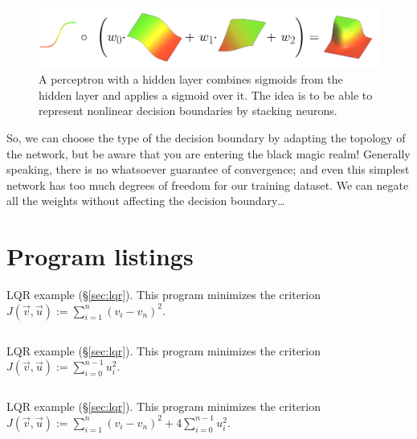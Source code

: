 \documentclass[notitlepage,oneside]{book}
\makeatletter
\newcommand{\authoredby}[1]{\addtocontents{toc}{\protect\@nameuse{authoredby#1}}}%
\makeatother
\begin{document}
\begin{figure}[t]
    \centering
    \includegraphics[width=.9\linewidth]{img/3n.jpg}
    \caption{A perceptron with a hidden layer combines sigmoids from the hidden layer and applies a sigmoid over it.
    The idea is to be able to represent nonlinear decision boundaries by stacking neurons.}
    \label{fig:sigmoids}
\end{figure}

So, we can choose the type of the decision boundary by adapting the topology of the network, but be aware that you are entering the black magic realm!
Generally speaking, there is no whatsoever guarantee of convergence; and even this simplest network has too much degrees of freedom for our training dataset.
We can negate all the weights without affecting the decision boundary\dots


\appendix
\authoredby{B}
\chapter{Program listings}
\fancyhead[R]{\textcolor{ao(english)}{core text}}

\begin{listing}[p]
\caption{LQR example (\S\ref{sec:lqr}). This program minimizes the criterion $J(\vec{v}, \vec{u}) := \sum\limits_{i=1}^n (v_i-v_n)^2$.}
\inputminted[frame=single,linenos=true]{python}{listings/example_6.1_a.py}
\label{listing:lqr1}
\end{listing}

\begin{listing}[p]
\caption{LQR example (\S\ref{sec:lqr}). This program minimizes the criterion $J(\vec{v}, \vec{u}) := \sum\limits_{i=0}^{n-1} u_i^2$.}
\inputminted[frame=single,linenos=true]{python}{listings/example_6.1_b.py}
\label{listing:lqr2}
\end{listing}

\begin{listing}[p]
\caption{LQR example (\S\ref{sec:lqr}). This program minimizes the criterion $J(\vec{v},\vec{u}) := \sum\limits_{i=1}^n (v_i-v_n)^2 + 4\sum\limits_{i=0}^{n-1} u_i^2$.}
\inputminted[frame=single,linenos=true]{python}{listings/example_6.1_c.py}
\label{listing:lqr3}
\end{listing}
\end{document}
